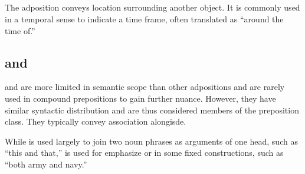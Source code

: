 \subsection{}
The adposition  conveys location surrounding another object. It is commonly used in a temporal sense to indicate a time frame, often translated as “around the time of.”

\subsection{ and } \label{subsec:u_and_su}
 and  are more limited in semantic scope than other adpositions and are rarely used in compound prepositions to gain further nuance. However, they have similar syntactic distribution and are thus considered members of the preposition class. They typically convey association alongisde.

While  is used largely to join two noun phrases as arguments of one head, such as  “this and that,”  is used for emphasize or in some fixed constructions, such as  “both army and navy.”




